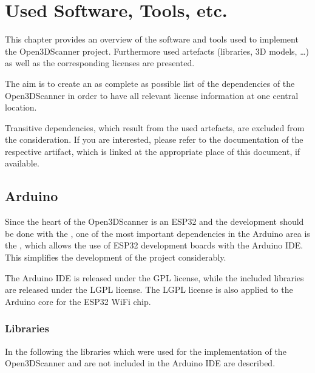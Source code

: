 \chapter[Used Software, Tools, etc.]{Used Software, Tools, etc.}%
\label{c:usedSoftware}%
This chapter provides an overview of the software and tools used to implement the Open3DScanner project. Furthermore used artefacts (libraries, 3D models, \dots) as well as the corresponding licenses are presented.%

The aim is to create an as complete as possible list of the dependencies of the Open3DScanner in order to have all relevant license information at one central location.%

Transitive dependencies, which result from the used artefacts, are excluded from the consideration. If you are interested, please refer to the documentation of the respective artifact, which is linked at the appropriate place of this document, if available.%

\section{Arduino}%
Since the heart of the Open3DScanner is an ESP32 and the development should be done with the , one of the most important dependencies in the Arduino area is the {\faGithub} , which allows the use of ESP32 development boards with the Arduino IDE. This simplifies the development of the project considerably.%

The Arduino IDE is released under the GPL license, while the included libraries are released under the LGPL license. The LGPL license is also applied to the Arduino core for the ESP32 WiFi chip.%

\subsection{Libraries}%
In the following the libraries which were used for the implementation of the Open3DScanner and are not included in the Arduino IDE are described.%

